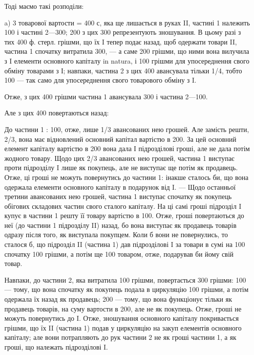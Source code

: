 Тоді маємо такі розподіли:

a) 3 товарової вартости = 400 с, яка ще лишається в руках II, частині
1 належить 100 і частині 2—300; 200 з цих 300 репрезентують
зношування. В цьому разі з тих 400 ф. стерл. грішми, що їх I тепер
подає назад, щоб одержати товари II, частина 1 спочатку витратила 300,
— а саме 200 грішми, що ними вона вилучила з I елементи основного
капіталу in natura, і 100 грішми для упосереднення свого обміну товарами
з І; навпаки, частина 2 з цих 400 авансувала тільки 1/4, тобто
100 — так само для упосереднення свого товарового обміну з I.

Отже, з цих 400 грішми частина 1 авансувала 300 і частина
2—100.

Але з цих 400 повертаються назад:

До частини 1 : 100, отже, лише 1/3 авансованих нею грошей. Але
замість решти, 2/3, вона має відновлений основний капітал вартістю в 200.
За цей основний елемент капіталу вартістю в 200 вона дала І підрозділові
гроші, але не дала потім жодного товару. Щодо цих 2/3
авансованих нею грошей, частина 1 виступає проти підрозділу I лише як
покупець, але не виступає ще потім як продавець. Отже, ці гроші
не можуть повернутись до частини 1: інакше сталось би, що вона одержала
елементи основного капіталу в подарунок від I. — Щодо останньої
третини авансованих нею грошей, частина 1 виступає спочатку
як покупець обігових складових частин свого сталого капіталу. На ці
самі гроші підрозділ I купує в частини 1 решту її товару вартістю
в 100. Отже, гроші повертаються до неї (до частини 1 підрозділу II)
назад, бо вона виступає як продавець товарів одразу після того, як
виступала покупцем. Коли б вони не повернулись, то сталося б, що
підрозділ II (частина 1) дав підрозділові I за товари в сумі на 100 спочатку
100 грішми, а потім ще 100 товаром, отже, подарував би йому
свій товар.

Навпаки, до частини 2, яка витратила 100 грішми, повертається
300 грішми: 100 — тому, що вона спочатку як покупець подала в циркуляцію
100 грішми, а потім одержала їх назад як продавець; 200 —
тому, що вона функціонує тільки як продавець товарів, на суму вартости
в 200, але не як покупець. Отже, гроші не можуть повернутись до I.
Отже, зношування основного капіталу покривається грішми, що їх II
(частина 1) подав у циркуляцію на закуп елементів основного капіталу;
але вони потрапляють до рук частини 2 не як гроші частини 1, а як
гроші, що належать підрозділові I.

